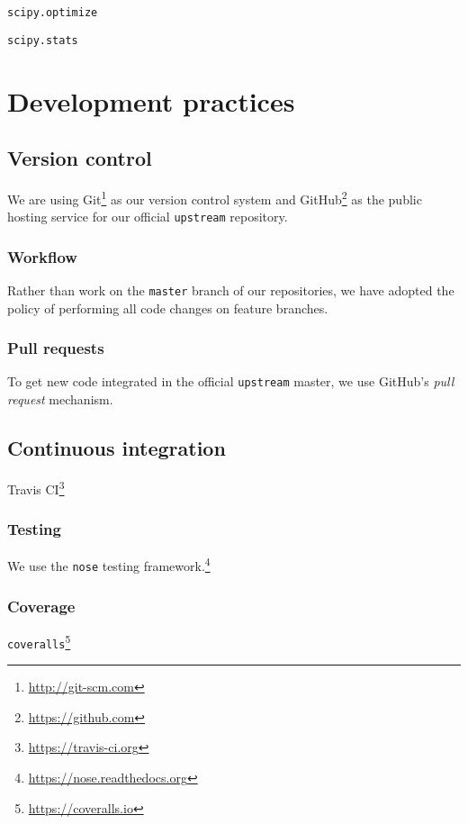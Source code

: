 \texttt{scipy.optimize}

\texttt{scipy.stats}

\section{Development practices}

\cite{millman2014}

\subsection{Version control}

We are using Git\footnote{\url{http://git-scm.com}} as our version control
system and GitHub\footnote{\url{https://github.com}} as the public hosting
service for our official \texttt{upstream} repository.

\subsubsection{Workflow}

Rather than work on the \texttt{master} branch of our repositories,
we have adopted the policy of performing all code changes on
feature branches.

\subsubsection{Pull requests}

To get new code integrated in the official \texttt{upstream} master,
we use GitHub's \emph{pull request} mechanism.

\subsection{Continuous integration}

Travis CI\footnote{\url{https://travis-ci.org}}

\subsubsection{Testing}

We use the \texttt{nose} testing framework.\footnote{\url{https://nose.readthedocs.org}}

\subsubsection{Coverage}

\texttt{coveralls}\footnote{\url{https://coveralls.io}}
